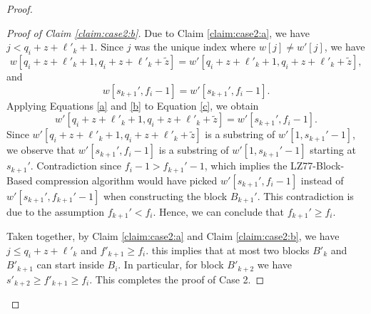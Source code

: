 \begin{proof}
\begin{enumerate}
\begin{proof}[Proof of Claim 
    \ref{claim:case2:b}]
Due to Claim \ref{claim:case2:a}, we have $j<q_i+z+\ell'_k+1$. Since $j$ was the unique index where $w[j]\neq w'[j]$, we have
\begin{equation}\label{a}
    w[q_i + z + \ell'_k + 1, q_i + z + \ell'_k + \tilde{z}] = w'[q_i + z + \ell'_k + 1, q_i + z + \ell'_k + \tilde{z}],
\end{equation}
and
\begin{equation}\label{b}
    w[s_{k+1}', f_i-1] = w'[s_{k+1}', f_i-1].
\end{equation}
Applying Equations \eqref{a} and \eqref{b} to Equation \eqref{c}, we obtain
\begin{equation}
    w'[q_i + z + \ell'_k + 1, q_i + z + \ell'_k + \tilde{z}] = w'[s_{k+1}', f_i-1].
\end{equation}
Since $w'[q_i + z + \ell'_k + 1, q_i + z + \ell'_k + \tilde{z}]$ is a substring of $w'[1,s_{k+1}'-1]$, we observe that $w'[s_{k+1}', f_i-1]$ is a substring of $w'[1,s_{k+1}'-1]$ starting at $s_{k+1}'$. Contradiction since $f_i-1 > f_{k+1}'-1$, which implies the LZ77-Block-Based compression algorithm would have picked $w'[s_{k+1}', f_i-1]$ instead of $w'[s_{k+1}', f_{k+1}'-1]$ when constructing the block $B_{k+1}'$. This contradiction is due to the assumption $f_{k+1}'<f_i$. Hence, we can conclude that $f_{k+1}'\geq f_i$.

Taken together, by Claim \ref{claim:case2:a} and Claim \ref{claim:case2:b}, we have $j\leq q_i+z+\ell'_k$ and $f'_{k+1}\geq f_i$. this implies that at most two blocks $B'_k$ and $B'_{k+1}$ can start inside $B_i$. In particular, for block $B'_{k+2}$ we have $s'_{k+2}\geq f'_{k+1}\geq f_i$. This completes the proof of Case 2.
\end{proof}


\end{enumerate}


\end{proof}
